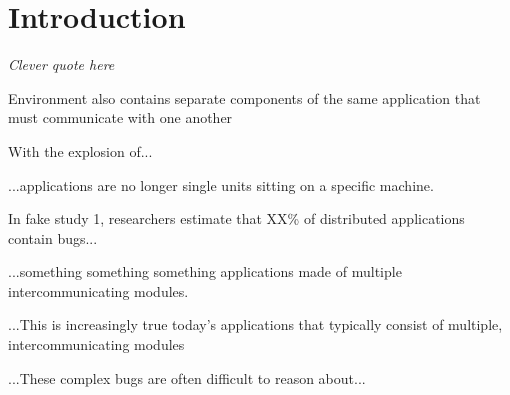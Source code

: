 \section{Introduction}
\label{SEC:introduction}

\textit{Clever quote here}


Environment also contains separate components of the same application
that must communicate with one another

With the explosion of...

...applications are no longer single units sitting on a specific machine.

In fake study 1, researchers estimate that XX\% of distributed applications
contain bugs...



...something something something applications made of multiple
intercommunicating modules.


...This is increasingly true today's applications that typically consist of
multiple, intercommunicating modules


...These complex bugs are often difficult to reason about...


